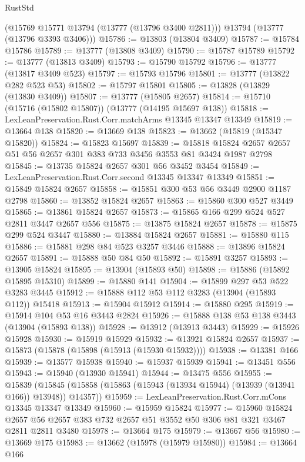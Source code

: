 \begin{lexlean}{RustStd}
\begin{coremodule}
      (@15769 @15771 @13794 (@13777 (@13796 @3400 @2811)))
      @13794
      (@13777 (@13796 @3393 @3406)))
@15786 := @13803 (@13804 @3409)
@15787 := @15784 @15786
@15789 := @13777 (@13808 @3409)
@15790 := @15787 @15789
@15792 := @13777 (@13813 @3409)
@15793 := @15790 @15792
@15796 := @13777 (@13817 @3409 @523)
@15797 := @15793 @15796
@15801 := @13777 (@13822 @282 @523 @53)
@15802 := @15797 @15801
@15805 := @13828 (@13829 (@13830 @3409))
@15807 := @13777 (@15805 @2657)
@15814 := @15710 (@15716 (@15802 @15807)) (@13777 (@14195 @15697 @138))
@15818 := LexLeanPreservation.Rust.Corr.matchArms @13345 @13347 @13349
@15819 := @13664 @138
@15820 := @13669 @138
@15823 := @13662 (@15819 (@15347 @15820))
@15824 := @15823 @15697
@15839 := @15818 @15824 @2657 @2657 @51 @56 @2657 @301 @383 @733 @3456 @3553 @81 @3424 @1987 @2798
@15845 := @13735 @15824 @2657 @301 @56 @3452 @3454
@15849 := LexLeanPreservation.Rust.Corr.second @13345 @13347 @13349
@15851 := @15849 @15824 @2657
@15858 := @15851 @300 @53 @56 @3449 @2900 @1187 @2798
@15860 := @13852 @15824 @2657
@15863 := @15860 @300 @527 @3449
@15865 := @13861 @15824 @2657
@15873 := @15865 @166 @299 @524 @527 @2811 @3447 @2657 @556
@15875 := @13875 @15824 @2657
@15878 := @15875 @299 @524 @3447
@15880 := @13884 @15824 @2657
@15881 := @15880 @115
@15886 := @15881 @298 @84 @523 @3257 @3446
@15888 := @13896 @15824 @2657
@15891 := @15888 @50 @84 @50
@15892 := @15891 @3257
@15893 := @13905 @15824
@15895 := @13904 (@15893 @50)
@15898 := @15886 (@15892 @15895 @15310)
@15899 := @15880 @141
@15904 := @15899 @297 @53 @522 @3283 @3445
@15912 := @15888 @112 @53 @112 @3283 (@13904 (@15893 @112)) @15418
@15913 := @15904 @15912
@15914 := @15880 @295
@15919 := @15914 @104 @53 @16 @3443 @2824
@15926 := @15888 @138 @53 @138 @3443 (@13904 (@15893 @138))
@15928 := @13912 (@13913 @3443)
@15929 := @15926 @15928
@15930 := @15919 @15929
@15932 := @13921 @15824 @2657
@15937 := @15873 (@15878 (@15898 (@15913 (@15930 @15932))))
@15938 := @13381 @166
@15939 := @13577 @15938
@15940 := @15937 @15939
@15941 := @13451 @556
@15943 := @15940 (@13930 @15941)
@15944 := @13475 @556
@15955 := @15839
    (@15845 (@15858 (@15863 (@15943 (@13934 @15944) (@13939 (@13941 @166)) @13948)) @14357))
@15959 := LexLeanPreservation.Rust.Corr.mCons @13345 @13347 @13349
@15960 := @15959 @15824
@15977 := @15960
    @15824
    @2657
    @56
    @2657
    @383
    @732
    @2657
    @51
    @3552
    @50
    @306
    @81
    @321
    @3467
    @2811
    @2811
    @3480
@15978 := @13664 @175
@15979 := @13667 @56
@15980 := @13669 @175
@15983 := @13662 (@15978 (@15979 @15980))
@15984 := @13664 @166

\end{coremodule}
\end{lexlean}
